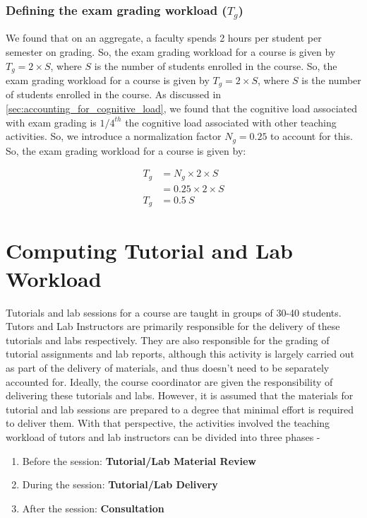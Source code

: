 \subsubsection{Defining the exam grading workload (\(T_g\))}

We found that on an aggregate, a faculty spends 2 hours per student per semester on grading. So, the exam grading workload for a course is given by \(T_g = 2 \times S\), where \(S\) is the number of students enrolled in the course. So, the exam grading workload for a course is given by \(T_g = 2 \times S\), where \(S\) is the number of students enrolled in the course.
As discussed in \autoref{sec:accounting_for_cognitive_load}, we found that the cognitive load associated with exam grading is \( 1/4^{th} \) the cognitive load associated with other teaching activities. So, we introduce a normalization factor \(N_g = 0.25\) to account for this. So, the exam grading workload for a course is given by:


\begin{equation}
  \label{eqn:exam-grading-workload}
  \begin{aligned}
    T_g & = N_g \times 2 \times S  \\
        & = 0.25 \times 2 \times S \\
    T_g & = 0.5\ S
  \end{aligned}
\end{equation}


\section{Computing Tutorial and Lab Workload}

Tutorials and lab sessions for a course are taught in groups of 30-40 students. Tutors and Lab Instructors are primarily responsible for the delivery of these tutorials and labs respectively. They are also responsible for the grading of tutorial assignments and lab reports, although this activity is largely carried out as part of the delivery of materials, and thus doesn't need to be separately accounted for. Ideally, the course coordinator are given the responsibility of delivering these tutorials and labs. However, it is assumed that the materials for tutorial and lab sessions are prepared to a degree that minimal effort is required to deliver them. With that perspective, the activities involved the teaching workload of tutors and lab instructors can be divided into three phases -

\begin{enumerate}
  \item Before the session: \textbf{Tutorial/Lab Material Review}
  \item During the session: \textbf{Tutorial/Lab Delivery}
  \item After the session: \textbf{Consultation}
\end{enumerate}

